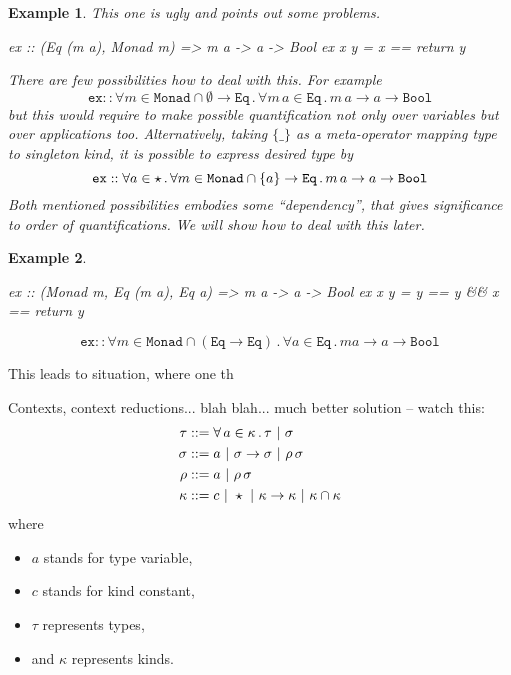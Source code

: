 \documentclass[11pt,oneside,draft]{fithesis2}
\newtheorem{example}{Example}
\begin{document}
\begin{example}
This one is ugly and points out some problems.
\begin{code}
ex :: (Eq (m a), Monad m) => m a -> a -> Bool
ex x y = x == return y
\end{code}
There are few possibilities how to deal with this. For example
\[ \texttt{ex} :: \forall m \in \texttt{Monad} \cap \emptyset \to \texttt{Eq} \, . \, \forall m \, a \in \texttt{Eq} \, . \, m \, a \to a \to \texttt{Bool} \]
but this would require to make possible quantification not only over variables but over applications too.
Alternatively, taking \(\{\_\}\) as a meta-operator mapping type to singleton kind,
it is possible to express desired type by
\[ \texttt{ex} :: \forall a \in \star \, . \, \forall m \in \texttt{Monad} \cap \{ a \} \to \texttt{Eq} \, . \, m \, a \to a \to \texttt{Bool} \]
Both mentioned possibilities embodies some ``dependency'', that gives significance to order of quantifications.
We will show how to deal with this later. %
\end{example}

\begin{example}~
\begin{code}
ex :: (Monad m, Eq (m a), Eq a) => m a -> a -> Bool
ex x y = y == y && x == return y
\end{code}
\[ \texttt{ex} :: \forall m \in \texttt{Monad} \cap (\texttt{Eq} \to \texttt{Eq}) \, . \, \forall a \in \texttt{Eq} \, . \, m a \to a \to \texttt{Bool} \]
\end{example}

This leads to situation, where one th

Contexts, context reductions... blah blah... much better solution -- watch this:
\begin{align*}
	\tau   & ::= \forall \, a \in \kappa \, . \, \tau ~|~ \sigma \\
	\sigma & ::= a ~|~ \sigma \to \sigma ~|~ \rho \, \sigma \\
	\rho   & ::= a ~|~ \rho \, \sigma \\
	\kappa & ::= c ~|~ \star ~|~ \kappa \to \kappa ~|~ \kappa \cap \kappa \\
\end{align*}
where
\begin{itemize}
	\item \(a\) stands for type variable,
	\item \(c\) stands for kind constant,
	\item \(\tau\) represents types,
	\item and \(\kappa\) represents kinds.
\end{itemize}
\end{document}
